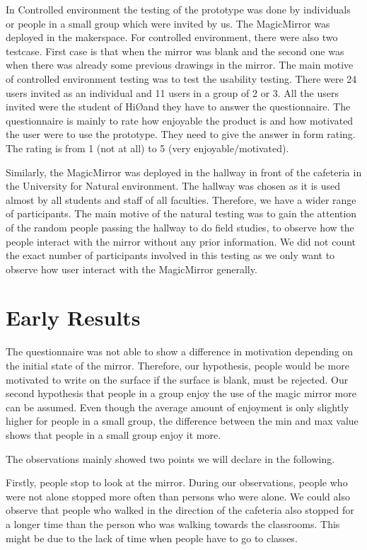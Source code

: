 \documentclass{sigchi-ext}
\begin{document}
In Controlled environment the testing of the prototype was done by individuals or people in a small group which were invited by us. The MagicMirror was deployed in the makerspace. For controlled environment, there were also two testcase. First case is that when the mirror was blank and the second one was when there was already some previous drawings in the mirror. The main motive of controlled environment testing was to test the usability testing. There were 24 users invited as an individual and 11 users in a group of 2 or 3. All the users invited were the student of Hi\O  and they have to answer the questionnaire. The questionnaire is mainly to rate how enjoyable the product is and how motivated the user were to use the prototype. They need to give the answer in form rating. The rating is from 1 (not at all) to 5 (very enjoyable/motivated).
 
Similarly, the MagicMirror was deployed in the hallway in front of the cafeteria in the University for Natural environment. The hallway was chosen as it is used almost by all students and staff of all faculties. Therefore, we have a wider range of participants. The main motive of the natural testing was to gain the attention of the random people passing the hallway to do field studies, to observe how the people interact with the mirror without any prior information. We did not count the exact number of participants involved in this testing as we only want to observe how user interact with the MagicMirror generally.

\section{Early Results}
The questionnaire was not able to show a difference in motivation depending on the initial state of the mirror. Therefore, our hypothesis, people would be more motivated to write on the surface if the surface is blank, must be rejected. Our second hypothesis that people in a group enjoy the use of the magic mirror more can be assumed. Even though the average amount of enjoyment is only slightly higher for people in a small group, the difference between the min and max value shows that people in a small group enjoy it more.

The observations mainly showed two points we will declare in the following. 

 Firstly, people stop to look at the mirror. During our observations, people who were not alone stopped more often than persons who were alone. We could also observe that people who walked in the direction of the cafeteria also stopped for a longer time than the person who was walking towards the classrooms. This might be due to the lack of time when people have to go to classes.
\end{document}
